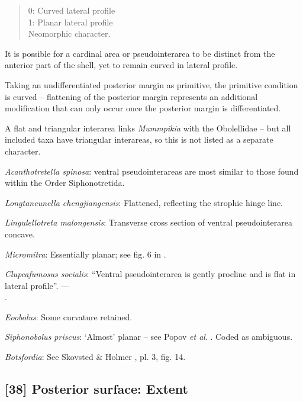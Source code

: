 \documentclass[openany]{book}
\theoremstyle{definition}
\theoremstyle{definition}
\theoremstyle{definition}
\theoremstyle{remark}
\begin{document}
\begin{quote}
0: Curved lateral profile\\
1: Planar lateral profile\\
Neomorphic character.
\end{quote}

It is possible for a cardinal area or pseudointerarea to be distinct
from the anterior part of the shell, yet to remain curved in lateral
profile.

Taking an undifferentiated posterior margin as primitive, the primitive
condition is curved -- flattening of the posterior margin represents an
additional modification that can only occur once the posterior margin is
differentiated.

A flat and triangular interarea links \emph{Mummpikia} with the
Obolellidae \citep{Balthasar2008iMummpikia} -- but all included taxa
have triangular interareas, so this is not listed as a separate
character.

\emph{Acanthotretella spinosa}: ventral pseudointerareas are most
similar to those found within the Order Siphonotretida.

\emph{Longtancunella chengjiangensis}: Flattened, reflecting the
strophic hinge line.

\emph{Lingulellotreta malongensis}: Transverse cross section of ventral
pseudointerarea concave.

\emph{Micromitra}: Essentially planar; see fig. 6 in
\citet{Ushatinskaya2016Protegulumand}.

\emph{Clupeafumosus socialis}: ``Ventral pseudointerarea is gently
procline and is flat in lateral profile''. ---\\
\citep{Topper2013Reappraisalof}.

\emph{Eoobolus}: Some curvature retained.

\emph{Siphonobolus priscus}: `Almost' planar -- see Popov \emph{et al}.
\citeyearpar[fig. 4]{Popov2009Earlyontogeny}. Coded as ambiguous.

\emph{Botsfordia}: See Skovsted \& Holmer
\citeyearpar{Skovsted2005EarlyCambrian}, pl. 3, fig. 14.

\hypertarget{posterior-surface-extent}{%
\subsection*{{[}38{]} Posterior surface:
Extent}\label{posterior-surface-extent}}
\end{document}
